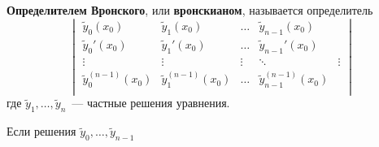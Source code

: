 \textbf{Определителем Вронского}, или \textbf{вронскианом}, называется определитель
\begin{equation*}
\begin{vmatrix}
\tilde y_0(x_0) & \tilde y_1(x_0) & \ldots & \tilde y_{n-1}(x_0) \\
\tilde y_0'(x_0) & \tilde y_1'(x_0) & \ldots & \tilde y_{n-1}'(x_0) \\
\vdots & \vdots & \vdots & \ddots & \vdots \\
\tilde y_0^{(n-1)}(x_0) & \tilde y_1^{(n-1)}(x_0) & \ldots & \tilde y_{n-1}^{(n-1)}(x_0) \\
\end{vmatrix}
\end{equation*}
где $\tilde y_1, \ldots, \tilde y_n$~--- частные решения уравнения.

\begin{statement}
Если решения $\tilde y_0, \ldots, \tilde y_{n-1}$ 
\end{statement}

